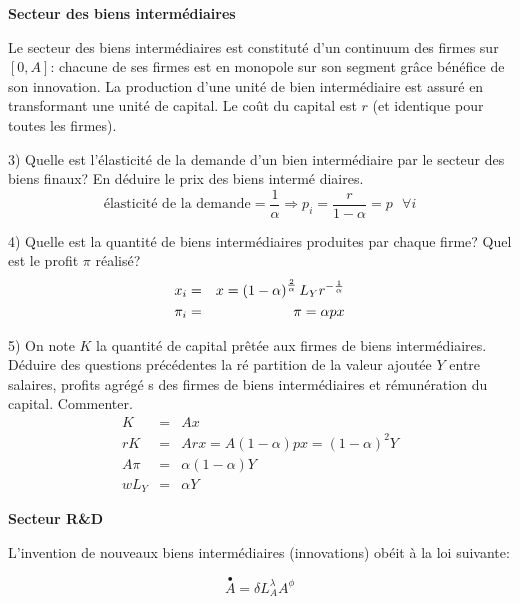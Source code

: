 \documentclass[a4paper]{article}
\begin{document}
\bigskip

\textbf{Secteur des biens interm\'{e}diaires}

\bigskip

Le secteur des biens interm\'{e}diaires est constitut\'{e} d'un continuum
des firmes sur $\left[ 0,A\right] $: chacune de ses firmes est en monopole
sur son segment gr\^{a}ce b\'{e}n\'{e}fice de son innovation. La production
d'une unit\'{e} de bien interm\'{e}diaire est assur\'{e} en transformant une
unit\'{e} de capital. Le co\^{u}t du capital est $r$ (et identique pour
toutes les firmes).

\bigskip

3) Quelle est l'\'{e}lasticit\'{e} de la demande d'un bien interm\'{e}diaire
par le secteur des biens finaux? En d\'{e}duire le prix des biens interm\'{e}%
diaires.%
\begin{equation*}
\text{\'{e}lasticit\'{e} de la demande}=\frac{1}{\alpha }\Rightarrow p_{i}=%
\frac{r}{1-\alpha }=p\text{ \ \ \ }\forall i
\end{equation*}

4) Quelle est la quantit\'{e} de biens interm\'{e}diaires produites par
chaque firme? Quel est le profit $\pi $ r\'{e}alis\'{e}?%
\begin{eqnarray*}
x_{i} &=&x=\left( 1-\alpha \right) ^{\frac{2}{\alpha }}L_{Y}r^{-\frac{1}{%
\alpha }} \\
\pi _{i} &=&\pi =\alpha px
\end{eqnarray*}

5) On note $K$ la quantit\'{e} de capital pr\^{e}t\'{e}e aux firmes de biens
interm\'{e}diaires. D\'{e}duire des questions pr\'{e}c\'{e}dentes la r\'{e}%
partition de la valeur ajout\'{e}e $Y$ entre salaires, profits agr\'{e}g\'{e}%
s des firmes de biens interm\'{e}diaires et r\'{e}mun\'{e}ration du capital.
Commenter.%
\begin{eqnarray*}
K &=&Ax \\
rK &=&Arx=A(1-\alpha )px=(1-\alpha )^{2}Y \\
A\pi &=&\alpha (1-\alpha )Y \\
wL_{Y} &=&\alpha Y
\end{eqnarray*}

\bigskip

\textbf{Secteur R\&D}

\bigskip

L'invention de nouveaux biens interm\'{e}diaires (innovations) ob\'{e}it 
\`{a} la loi suivante:

\begin{equation*}
\overset{\bullet }{A}=\delta L_{A}^{\lambda }A^{\phi }
\end{equation*}
\end{document}
